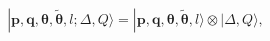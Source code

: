 \begin{equation}
 |\boldsymbol p,\boldsymbol q,
\boldsymbol\theta,\boldsymbol{\tilde\theta},l;\Delta,Q\rangle=
 |\boldsymbol p,\boldsymbol q,
\boldsymbol\theta,\boldsymbol{\tilde\theta},l\rangle
\otimes|\Delta,Q\rangle,
\end{equation}

